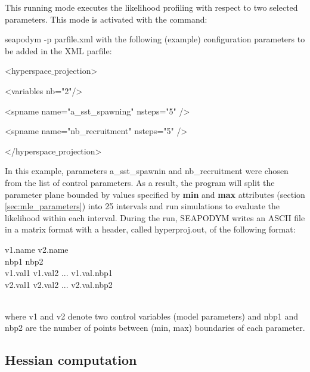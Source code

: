 This running mode executes the likelihood profiling with respect to two selected parameters. This mode is activated with the command:
\vspace{0.35cm}

{\ttfamily
  seapodym -p parfile.xml
}
\vspace{0.35cm}
\noindent with the following (example) configuration parameters to be added in the XML parfile:

\vspace{0.5cm}
{\ttfamily
	<hyperspace$\_$projection>
	
\hspace{0.5cm} <variables nb="2"/>
        
\hspace{0.5cm} <spname name="a\_sst\_spawning" nsteps="5" />
        
\hspace{0.5cm} <spname name="nb\_recruitment" nsteps="5" />
        
	</hyperspace$\_$projection>
}
\vspace{0.5cm}

\noindent In this example, parameters {\ttfamily a\_sst\_spawnin} and {\ttfamily nb\_recruitment} were chosen from the list of control parameters. As a result, the program will split the parameter plane bounded by values specified by {\bfseries min} and {\bfseries max} attributes (section \ref{sec:mle_parameters}) into 25 intervals and run simulations to evaluate the likelihood within each interval. During the run, SEAPODYM writes an ASCII file in a matrix format with a header, called  {\ttfamily hyperproj.out}, of the following format:

\vspace{0.5cm}
{\ttfamily
\noindent 
\indent v1.name v2.name\\
\indent nbp1 nbp2\\
\indent v1.val1 v1.val2 ... v1.val.nbp1\\
\indent v2.val1 v2.val2 ... v2.val.nbp2\\
\\
}
\vspace{0.5cm}

\noindent where {\ttfamily v1} and {\ttfamily v2} denote two control variables (model parameters) and {\ttfamily nbp1} and {\ttfamily nbp2} are the number of points between (min, max) boundaries of each parameter.  

\subsection{Hessian computation}\label{sec:hessian-run}

